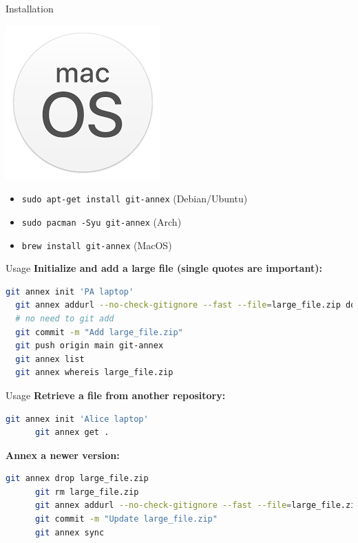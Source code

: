 \begin{frame}{Installation}
\begin{center}
\begin{minipage}{0.2\textwidth}
    \end{minipage}%
    \begin{minipage}{0.2\textwidth}
      \centering
      \includegraphics[width=0.5\linewidth]{images/macOS-logo.png}
    \end{minipage}
  \end{center}

  \vspace{0.5cm}

  \begin{itemize}
    \item \texttt{sudo apt-get install git-annex} (Debian/Ubuntu)
    \item \texttt{sudo pacman -Syu git-annex} (Arch)
    \item \texttt{brew install git-annex} (MacOS)
  \end{itemize}
\end{frame}

\begin{frame}[fragile]{Usage}
  \textbf{Initialize and add a large file (single quotes are important):}
  \begin{lstlisting}[language=bash]
  git annex init 'PA laptop'
  git annex addurl --no-check-gitignore --fast --file=large_file.zip download_url_link
  # no need to git add
  git commit -m "Add large_file.zip"
  git push origin main git-annex
  git annex list
  git annex whereis large_file.zip
\end{lstlisting}
\end{frame}

\begin{frame}[fragile]{Usage}
  \textbf{Retrieve a file from another repository:}
  \begin{lstlisting}[language=bash]
      git annex init 'Alice laptop'
      git annex get .
    \end{lstlisting}
  \textbf{Annex a newer version:}
    \begin{lstlisting}[language=bash]
      git annex drop large_file.zip
      git rm large_file.zip
      git annex addurl --no-check-gitignore --fast --file=large_file.zip download_url_link
      git commit -m "Update large_file.zip"
      git annex sync
  \end{lstlisting}
\end{frame}

